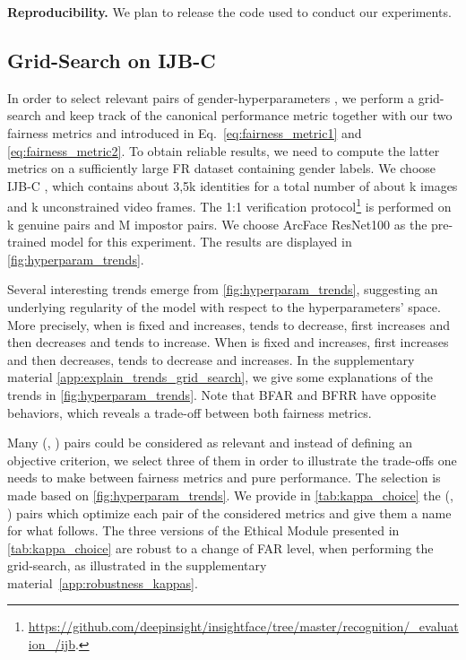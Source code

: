 \documentclass[nohyperref]{article}
\theoremstyle{plain}
\theoremstyle{definition}
\theoremstyle{remark}
\begin{document}
{\bf Reproducibility.} We plan to release the code used to conduct our experiments.


\subsection{Grid-Search on IJB-C}\label{subsec:grid_search_ijbc}

In order to select relevant pairs of gender-hyperparameters , we perform a grid-search and keep track of the canonical performance metric  together with our two fairness metrics  and  introduced in Eq.~\ref{eq:fairness_metric1} and \ref{eq:fairness_metric2}. To obtain reliable results, we need to compute the latter metrics on a sufficiently large FR dataset containing gender labels. We choose IJB-C \cite{maze2018iarpa}, which contains about 3,5k identities for a total number of about k images and k unconstrained video frames. The 1:1 verification protocol\footnote{\url{https://github.com/deepinsight/insightface/tree/master/recognition/_evaluation_/ijb}.}  is performed on k genuine pairs and M impostor pairs. We choose ArcFace ResNet100 as the pre-trained model for this experiment. The results are displayed in \autoref{fig:hyperparam_trends}.



Several interesting trends emerge from \autoref{fig:hyperparam_trends}, suggesting an underlying regularity of the model with respect to the hyperparameters' space. More precisely, when  is fixed and  increases,  tends to decrease,  first increases and then decreases and  tends to increase. When  is fixed and  increases,  first increases and then decreases,  tends to decrease and  increases. In the supplementary material \ref{app:explain_trends_grid_search}, we give some explanations of the trends in \autoref{fig:hyperparam_trends}. Note that BFAR and BFRR have opposite behaviors, which reveals a trade-off between both fairness metrics. 










Many  (, ) pairs could be considered as relevant and instead of defining an objective criterion, we select three of them in order to illustrate the trade-offs one needs to make between fairness metrics and pure performance. The selection is made based on \autoref{fig:hyperparam_trends}. We provide in \autoref{tab:kappa_choice} the (, ) pairs which optimize each pair of the  considered metrics and give them a name for what follows. The three versions of the Ethical Module presented in \autoref{tab:kappa_choice} are robust to a change of FAR level, when performing the grid-search, as illustrated in the supplementary material~\ref{app:robustness_kappas}.
\end{document}
